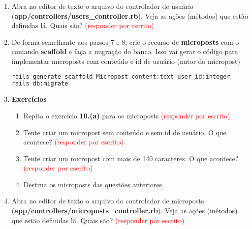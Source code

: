 \documentclass[a4paper,12pt]{article}
\begin{document}
\begin{enumerate}
  \item Abra no editor de texto o arquivo do controlador de usuário (\textbf{app/controllers/users\_controller.rb}). Veja as ações (métodos) que estão definidas lá. Quais são? \textcolor{red}{(responder por escrito)}


  \item De forma semelhante aos passos 7 e 8, crie o recurso de \textbf{microposts} com o comando \textbf{scaffold} e faça a migração do banco. Isso vai gerar o código para implementar microposts com conteúdo e id de usuário (autor do micropost)

    \begin{lstlisting}[language=Bash, basicstyle=\fontsize{8.5}{12}\selectfont\ttfamily]
rails generate scaffold Micropost content:text user_id:integer
rails db:migrate
    \end{lstlisting}

  \item \textbf{Exercícios}

    \begin{enumerate}
      \item Repita o exercício \textbf{10.(a)} para os microposts \textcolor{red}{(responder por escrito)}
      \item Tente criar um micropost sem conteúdo e sem id de usuário. O que acontece? \textcolor{red}{(responder por escrito)}
      \item Tente criar um micropost com mais de 140 caracteres. O que acontece? \textcolor{red}{(responder por escrito)}
      \item Destrua os microposts das questões anteriores
    \end{enumerate}

  \item Abra no editor de texto o arquivo do controlador de microposts (\textbf{app/controllers/microposts\_controller.rb}). Veja as ações (métodos) que estão definidas lá. Quais são? \textcolor{red}{(responder por escrito)}


\end{enumerate}
\end{document}
